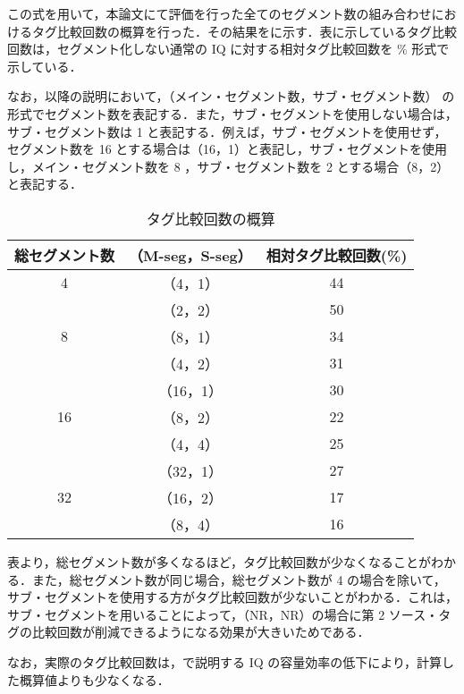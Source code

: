 この式を用いて，本論文にて評価を行った全てのセグメント数の組み合わせにおけるタグ比較回数の概算を行った．その結果をに示す．表に示しているタグ比較回数は，セグメント化しない通常の IQ に対する相対タグ比較回数を \% 形式で示している．

なお，以降の説明において，（メイン・セグメント数，サブ・セグメント数） の形式でセグメント数を表記する．また，サブ・セグメントを使用しない場合は，サブ・セグメント数は 1 と表記する．例えば，サブ・セグメントを使用せず，セグメント数を 16 とする場合は（16，1）と表記し，サブ・セグメントを使用し，メイン・セグメント数を 8 ，サブ・セグメント数を 2 とする場合（8，2）と表記する．

\begin{table}[htb]
  \caption{タグ比較回数の概算}
  \footnotesize
  \center
    \begin{tabular}{c|c|c} \hline \hline
    総セグメント数 & （M-seg，S-seg） & 相対タグ比較回数(\%) \\ \hline
    4 &（4，1） & 44 \\
    &（2，2） & 50 \\ \hline
    8 &（8，1） & 34 \\
    &（4，2） & 31 \\ \hline
    &（16，1） & 30 \\
    16 &（8，2） & 22 \\
    &（4，4） & 25 \\ \hline
    &（32，1） & 27 \\
    32 &（16，2） & 17 \\
    &（8，4） & 16 \\ \hline
  \end{tabular}
  \label{tab:comp_estimate}
\end{table}

表より，総セグメント数が多くなるほど，タグ比較回数が少なくなることがわかる．また，総セグメント数が同じ場合，総セグメント数が 4 の場合を除いて，サブ・セグメントを使用する方がタグ比較回数が少ないことがわかる．これは，サブ・セグメントを用いることによって，（NR，NR）の場合に第 2 ソース・タグの比較回数が削減できるようになる効果が大きいためである．

なお，実際のタグ比較回数は，で説明する IQ の容量効率の低下により，計算した概算値よりも少なくなる．
